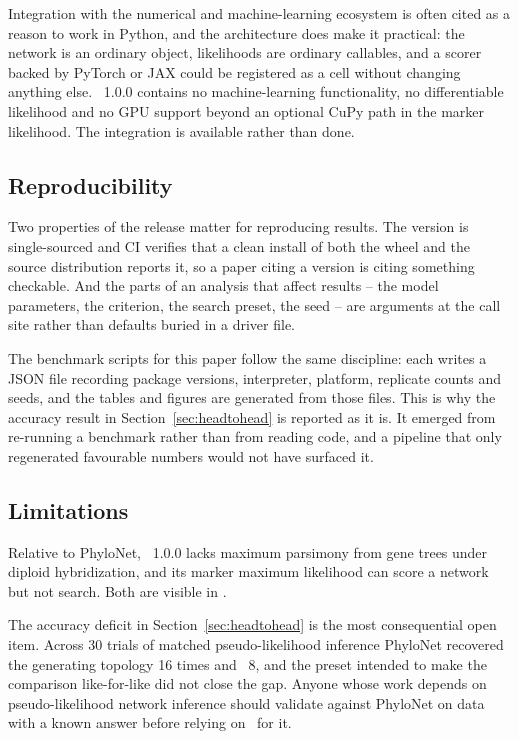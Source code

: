 Integration with the numerical and machine-learning ecosystem is often cited as a
reason to work in Python, and the architecture does make it practical: the
network is an ordinary object, likelihoods are ordinary callables, and a scorer
backed by PyTorch or JAX could be registered as a cell without changing anything
else. \phynetpy\ 1.0.0 contains no machine-learning functionality, no
differentiable likelihood and no GPU support beyond an optional CuPy path in the
marker likelihood. The integration is available rather than done.

\subsection{Reproducibility}

Two properties of the release matter for reproducing results. The version is
single-sourced and CI verifies that a clean install of both the wheel and the
source distribution reports it, so a paper citing a version is citing something
checkable. And the parts of an analysis that affect results -- the model
parameters, the criterion, the search preset, the seed -- are arguments at the
call site rather than defaults buried in a driver file.

The benchmark scripts for this paper follow the same discipline: each writes a
JSON file recording package versions, interpreter, platform, replicate counts and
seeds, and the tables and figures are generated from those files. This is why the
accuracy result in Section~\ref{sec:headtohead} is reported as it is. It emerged
from re-running a benchmark rather than from reading code, and a pipeline that
only regenerated favourable numbers would not have surfaced it.

\subsection{Limitations}

Relative to PhyloNet, \phynetpy\ 1.0.0 lacks maximum parsimony from gene trees
under diploid hybridization, and its marker maximum likelihood can score a
network but not search. Both are visible in .

The accuracy deficit in Section~\ref{sec:headtohead} is the most consequential
open item. Across 30 trials of matched pseudo-likelihood inference PhyloNet
recovered the generating topology 16 times and \phynetpy\ 8, and the
 preset intended to make the comparison like-for-like did not
close the gap. Anyone whose work depends on pseudo-likelihood network inference
should validate against PhyloNet on data with a known answer before relying on
\phynetpy\ for it.

